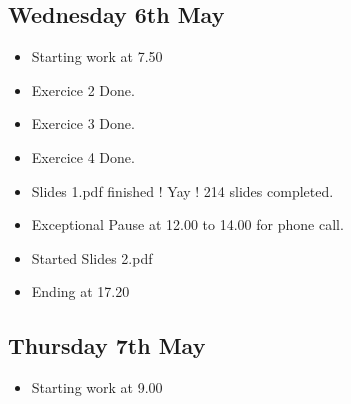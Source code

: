 \documentclass[a4paper, 10pt]{article}
\begin{document}
\subsection*{Wednesday 6th May}
\begin{itemize}
    \item Starting work at 7.50
    \item Exercice 2 Done.
    \item Exercice 3 Done.
    \item Exercice 4 Done.
    \item Slides 1.pdf finished ! Yay ! 214 slides completed.
    \item Exceptional Pause at 12.00 to 14.00 for phone call.
    \item Started Slides 2.pdf
    \item Ending at 17.20
\end{itemize}

\subsection*{Thursday 7th May}
\begin{itemize}
    \item Starting work at 9.00
\end{itemize}
\end{document}

